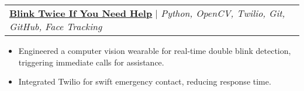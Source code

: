\documentclass[letterpaper]{article}
\makeatletter
\newcommand{\resumeItem}[1]{
  \item\small{
    {#1 \vspace{-2pt}}
  }
}
\newcommand{\resumeProjectHeading}[2]{
    \item
    \begin{tabular*}{0.97\textwidth}{l@{\extracolsep{\fill}}r}
      \small#1 & #2 \\
    \end{tabular*}\vspace{-7pt}
}
\newcommand{\resumeProjectHeadingWithDetails}[4]{
    \item
    \begin{tabular*}{0.97\textwidth}{l@{\extracolsep{\fill}}r}
      \small#1 & #2 \\[5pt] %
      \textit{\small#3} & \textit{\small #4} \\
    \end{tabular*}\vspace{-7pt}
}
\newcommand{\resumeItemListStart}{\begin{itemize}}
\newcommand{\resumeItemListEnd}{\end{itemize}\vspace{-5pt}}
\makeatother
\begin{document}

      \resumeProjectHeading
          {\textbf{\underline{\href{https://devpost.com/software/blink-twice-if-you-need-help}{Blink Twice If You Need Help}}} $|$ \emph{Python, OpenCV, Twilio, Git, GitHub, Face Tracking}}{}
          \resumeItemListStart
            \resumeItem{Engineered a computer vision wearable for real-time double blink detection, triggering immediate calls for assistance.}
            \resumeItem{Integrated Twilio for swift emergency contact, reducing response time.}
          \resumeItemListEnd    



    
\end{document}
